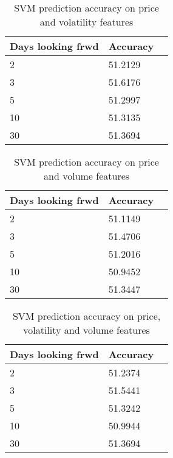 \documentclass{article}
\begin{document}
\begin{table}[!h]
\begin{center}
    \begin{tabular}{ | l | l | p{3cm} |}
    \hline
    Days looking frwd & Accuracy \\ \hline
    2 & 51.2129  \\ \hline
    3 & 51.6176  \\ \hline
    5 & 51.2997  \\ \hline
    10 & 51.3135  \\ \hline
    30 & 51.3694 \\ 
    \hline
    \end{tabular}
\caption{SVM prediction accuracy on price and volatility features}
\end{center}
\end{table}

\begin{table}[!h]
\begin{center}
    \begin{tabular}{ | l | l | p{3cm} |}
    \hline
    Days looking frwd & Accuracy \\ \hline
    2 & 51.1149  \\ \hline
    3 & 51.4706  \\ \hline
    5 & 51.2016  \\ \hline
    10 & 50.9452  \\ \hline
    30 & 51.3447 \\ 
    \hline
    \end{tabular}
\caption{SVM prediction accuracy on price and volume features}
\end{center}
\end{table}

\begin{table}[!h]
\begin{center}
    \begin{tabular}{ | l | l | p{3cm} |}
    \hline
    Days looking frwd & Accuracy \\ \hline
    2 & 51.2374  \\ \hline
    3 & 51.5441  \\ \hline
    5 & 51.3242  \\ \hline
    10 & 50.9944  \\ \hline
    30 & 51.3694 \\ 
    \hline
    \end{tabular}
\caption{SVM prediction accuracy on price, volatility and volume features}
\end{center}
\end{table}
\end{document}
